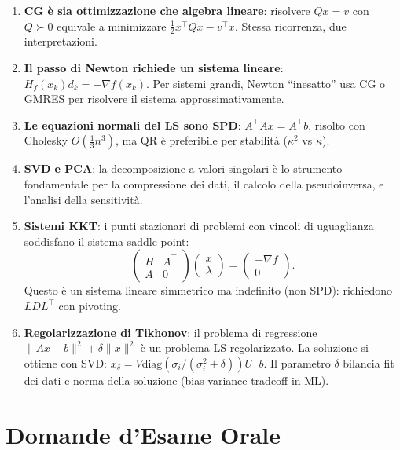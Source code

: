 \documentclass[11pt, a4paper, twoside]{book}
\theoremstyle{definition}
\theoremstyle{plain}
\theoremstyle{remark}
\begin{document}
\begin{enumerate}
  \item \textbf{CG è sia ottimizzazione che algebra lineare}: risolvere $Qx = v$ con $Q \succ 0$ equivale a minimizzare $\frac{1}{2}x^\top Qx - v^\top x$. Stessa ricorrenza, due interpretazioni.

  \item \textbf{Il passo di Newton richiede un sistema lineare}: $H_f(x_k)d_k = -\nabla f(x_k)$. Per sistemi grandi, Newton ``inesatto'' usa CG o GMRES per risolvere il sistema approssimativamente.

  \item \textbf{Le equazioni normali del LS sono SPD}: $A^\top Ax = A^\top b$, risolto con Cholesky $O(\frac{1}{3}n^3)$, ma QR è preferibile per stabilità ($\kappa^2$ vs $\kappa$).

  \item \textbf{SVD e PCA}: la decomposizione a valori singolari è lo strumento fondamentale per la compressione dei dati, il calcolo della pseudoinversa, e l'analisi della sensitività.

  \item \textbf{Sistemi KKT}: i punti stazionari di problemi con vincoli di uguaglianza soddisfano il sistema saddle-point:
  \[
    \begin{pmatrix} H & A^\top \\ A & 0 \end{pmatrix}
    \begin{pmatrix} x \\ \lambda \end{pmatrix}
    =
    \begin{pmatrix} -\nabla f \\ 0 \end{pmatrix}.
  \]
  Questo è un sistema lineare simmetrico ma indefinito (non SPD): richiedono $LDL^\top$ con pivoting.

  \item \textbf{Regolarizzazione di Tikhonov}: il problema di regressione $\|Ax - b\|^2 + \delta\|x\|^2$ è un problema LS regolarizzato. La soluzione si ottiene con SVD: $x_\delta = V \mathrm{diag}(\sigma_i/(\sigma_i^2+\delta)) U^\top b$. Il parametro $\delta$ bilancia fit dei dati e norma della soluzione (bias-variance tradeoff in ML).
\end{enumerate}

\part{Domande d'Esame Orale}
\label{part:domande}
\end{document}
